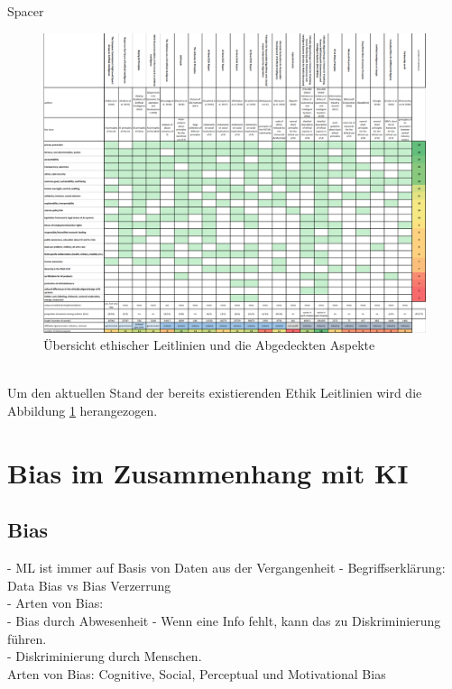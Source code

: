 \begin{onehalfspace}
        \newpage
        Spacer
        \begin{figure}[h]
            \centering
            \includegraphics[width = \textwidth]{Bilder/Ethical huidelines hagendorf 2020.png}
            \caption{Übersicht ethischer Leitlinien und die Abgedeckten Aspekte \cite{Hagendorff2020}}
            \label{fig:EthikGuidelines}
        \end{figure} \\
        Um den aktuellen Stand der bereits existierenden Ethik Leitlinien wird die Abbildung \ref*{fig:EthikGuidelines} herangezogen.\cite{Hagendorff2020}

    \newpage
    \section{Bias im Zusammenhang mit \ac{KI}}
    \label{subsec:KIundbias}
    \subsection{Bias}
    \label{subsubsec:Bias}
        - ML ist immer auf Basis von Daten aus der Vergangenheit 
        -   Begriffserklärung: Data Bias vs Bias Verzerrung\\
        -   Arten von Bias: \\
            -   Bias durch Abwesenheit - Wenn eine Info fehlt, kann das zu Diskriminierung führen. \\
            -   Diskriminierung durch Menschen. \\
        Arten von Bias: Cognitive, Social, Perceptual und Motivational Bias \cite{HEGKI2019Definition}\cite{Parkavi2018} \cite{Fabi2022}


\end{onehalfspace}
